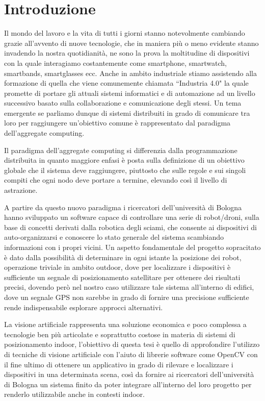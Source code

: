 \documentclass[12pt,a4paper,openright,twoside]{book}
\begin{document}
\mainmatter

\chapter{Introduzione}
Il mondo del lavoro e la vita di tutti i giorni stanno notevolmente cambiando grazie all'avvento di nuove tecnologie, che in maniera più o meno evidente stanno invadendo la nostra quotidianità, ne sono la prova la moltitudine di dispositivi con la quale interagiamo costantemente come smartphone, smartwatch, smartbands, smartglasses ecc.
Anche in ambito industriale stiamo assistendo alla formazione di quella che viene comunemente chiamata ``Industria 4.0" la quale promette di portare gli attuali sistemi informatici e di automazione ad un livello successivo basato sulla collaborazione e comunicazione degli stessi.
Un tema emergente se parliamo dunque di sistemi distribuiti in grado di comunicare tra loro per raggiungere un'obiettivo comune è rappresentato dal paradigma dell'aggregate computing.

Il paradigma dell'aggregate computing si differenzia dalla programmazione distribuita in quanto maggiore enfasi è posta sulla definizione di un obiettivo globale che il sistema deve raggiungere, piuttosto che sulle regole e sui singoli compiti che ogni nodo deve portare a termine, elevando così il livello di astrazione.

A partire da questo nuovo paradigma i ricercatori dell'università di Bologna hanno sviluppato un software capace di controllare una serie di robot/droni, sulla base di concetti derivati dalla robotica degli sciami, che consente ai dispositivi di auto-organizzarsi e conoscere lo stato generale del sistema scambiando informazioni con i propri vicini.
Un aspetto fondamentale del progetto sopracitato è dato dalla possibilità di determinare in ogni istante la posizione dei robot, operazione triviale in ambito outdoor, dove per localizzare i dispositivi è sufficiente un segnale di posizionamento satellitare per ottenere dei risultati precisi, dovendo però nel nostro caso utilizzare tale sistema all'interno di edifici, dove un segnale GPS non sarebbe in grado di fornire una precisione sufficiente rende indispensabile esplorare approcci alternativi.

La visione artificiale rappresenta una soluzione economica e poco complessa a tecnologie ben più articolate e soprattutto costose in materia di sistemi di posizionamento indoor, l'obiettivo di questa tesi è quello di approfondire l'utilizzo di tecniche di visione artificiale con l'aiuto di librerie software come OpenCV con il fine ultimo di ottenere un applicativo in grado di rilevare e localizzare i dispositivi in una determinata scena, così da fornire ai ricercatori dell'università di Bologna un sistema finito da poter integrare all'interno del loro progetto per renderlo utilizzabile anche in contesti indoor.
\end{document}
